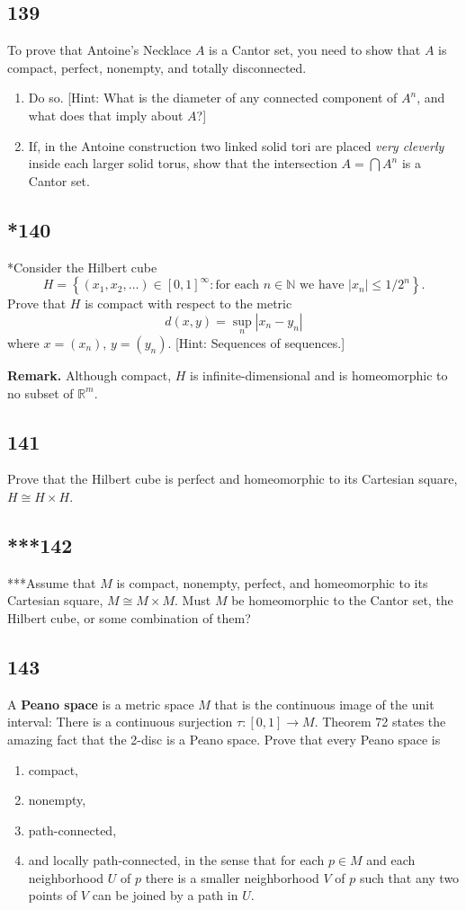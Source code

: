 \documentclass{amsart}
\begin{document}
\subsection*{139}
To prove that Antoine's Necklace $A$ is a Cantor set, you need to show that $A$ is compact, perfect, nonempty, and totally disconnected.
\begin{enumerate}[label=(\alph*)]
\item Do so. [Hint: What is the diameter of any connected component of $A^n$, and what does that imply about $A$?]
\item[**(b)] If, in the Antoine construction two linked solid tori are placed \emph{very cleverly} inside each larger solid torus, show that the intersection $A = \bigcap A^n$ is a Cantor set.
\end{enumerate}

\subsection*{*140}
*Consider the Hilbert cube
\[
H = \left\{ (x_1,x_2,\ldots) \in [0,1]^\infty : \text{for each } n \in \mathbb{N} \text{ we have } |x_n| \le 1/2^n \right\}.
\]
Prove that $H$ is compact with respect to the metric
\[
d(x,y) = \sup_n |x_n - y_n|
\]
where $x=(x_n)$, $y=(y_n)$. [Hint: Sequences of sequences.]

\textbf{Remark.} Although compact, $H$ is infinite-dimensional and is homeomorphic to no subset of $\mathbb{R}^m$.

\subsection*{141}
Prove that the Hilbert cube is perfect and homeomorphic to its Cartesian square, $H \cong H \times H$.

\subsection*{***142}
***Assume that $M$ is compact, nonempty, perfect, and homeomorphic to its Cartesian square, $M \cong M \times M$. Must $M$ be homeomorphic to the Cantor set, the Hilbert cube, or some combination of them?

\subsection*{143}
A \textbf{Peano space} is a metric space $M$ that is the continuous image of the unit interval: There is a continuous surjection $\tau : [0,1] \to M$. Theorem 72 states the amazing fact that the 2-disc is a Peano space. Prove that every Peano space is
\begin{enumerate}[label=(\alph*)]
\item compact,
\item nonempty,
\item path-connected,
\item[*(d)] and locally path-connected, in the sense that for each $p \in M$ and each neighborhood $U$ of $p$ there is a smaller neighborhood $V$ of $p$ such that any two points of $V$ can be joined by a path in $U$.
\end{enumerate}
\end{document}
